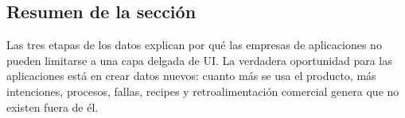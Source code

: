\subsection{Resumen de la sección}

Las tres etapas de los datos explican por qué las empresas de aplicaciones no pueden limitarse a una capa delgada de UI. La verdadera oportunidad para las aplicaciones está en crear datos nuevos: cuanto más se usa el producto, más intenciones, procesos, fallas, recipes y retroalimentación comercial genera que no existen fuera de él.
